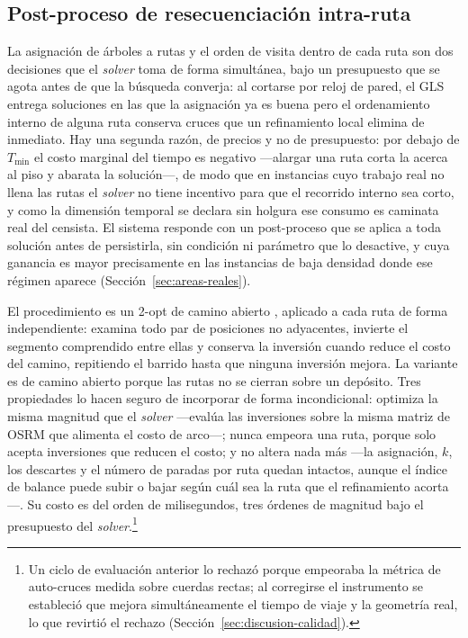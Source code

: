 \subsection{Post-proceso de resecuenciación intra-ruta}
\label{sec:postpass}

La asignación de árboles a rutas y el orden de visita dentro de cada ruta son dos decisiones que el
\textit{solver} toma de forma simultánea, bajo un presupuesto que se agota antes de que la búsqueda
converja: al cortarse por reloj de pared, el GLS entrega soluciones en las que la asignación ya es
buena pero el ordenamiento interno de alguna ruta conserva cruces que un refinamiento local elimina
de inmediato. Hay una segunda razón, de precios y no de presupuesto: por debajo de $T_{\min}$ el
costo marginal del tiempo es negativo ---alargar una ruta corta la acerca al piso y abarata la
solución---, de modo que en instancias cuyo trabajo real no llena las rutas el \textit{solver} no
tiene incentivo para que el recorrido interno sea corto, y como la dimensión temporal se declara
sin holgura ese consumo es caminata real del censista. El sistema responde con un post-proceso que
se aplica a toda solución antes de persistirla, sin condición ni parámetro que lo desactive, y cuya
ganancia es mayor precisamente en las instancias de baja densidad donde ese régimen aparece
(Sección~\ref{sec:areas-reales}).

El procedimiento es un 2-opt de camino abierto \citep{croes1958method,lin1965computer}, aplicado a
cada ruta de forma independiente: examina todo par de posiciones no adyacentes, invierte el
segmento comprendido entre ellas y conserva la inversión cuando reduce el costo del camino,
repitiendo el barrido hasta que ninguna inversión mejora. La variante es de camino abierto porque
las rutas no se cierran sobre un depósito. Tres propiedades lo hacen seguro de incorporar de forma
incondicional: optimiza la misma magnitud que el \textit{solver} ---evalúa las inversiones sobre la
misma matriz de OSRM que alimenta el costo de arco---; nunca empeora una ruta, porque solo acepta
inversiones que reducen el costo; y no altera nada más ---la asignación, $k$, los descartes y el
número de paradas por ruta quedan intactos, aunque el índice de balance puede subir o bajar según
cuál sea la ruta que el refinamiento acorta---. Su costo es del orden de milisegundos, tres órdenes
de magnitud bajo el presupuesto del \textit{solver}.\footnote{Un ciclo de evaluación anterior lo
rechazó porque empeoraba la métrica de auto-cruces medida sobre cuerdas rectas; al corregirse el
instrumento se estableció que mejora simultáneamente el tiempo de viaje y la geometría real, lo que
revirtió el rechazo (Sección~\ref{sec:discusion-calidad}).}

